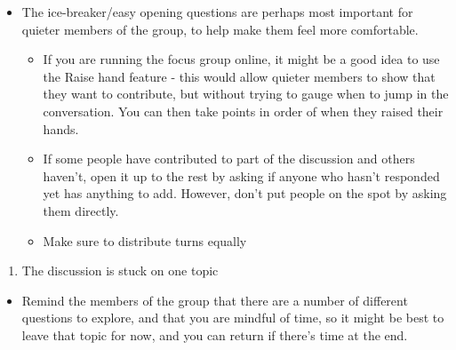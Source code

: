 \documentclass[
  english,
  letterpaper,
  DIV=11,
  numbers=noendperiod]{scrreprt}
\providecommand{\tightlist}{%
  \setlength{\itemsep}{0pt}\setlength{\parskip}{0pt}}
\begin{document}
\begin{tcolorbox}[enhanced jigsaw, breakable, bottomtitle=1mm, leftrule=.75mm, opacityback=0, colbacktitle=quarto-callout-caution-color!10!white, opacitybacktitle=0.6, toprule=.15mm, colback=white, left=2mm, coltitle=black, bottomrule=.15mm, titlerule=0mm, title={Suggested Solutions}, toptitle=1mm, colframe=quarto-callout-caution-color-frame, arc=.35mm, rightrule=.15mm]

\begin{itemize}
\tightlist
\item
  The ice-breaker/easy opening questions are perhaps most important for
  quieter members of the group, to help make them feel more comfortable.

  \begin{itemize}
  \tightlist
  \item
    If you are running the focus group online, it might be a good idea
    to use the Raise hand feature - this would allow quieter members to
    show that they want to contribute, but without trying to gauge when
    to jump in the conversation. You can then take points in order of
    when they raised their hands.
  \item
    If some people have contributed to part of the discussion and others
    haven't, open it up to the rest by asking if anyone who hasn't
    responded yet has anything to add. However, don't put people on the
    spot by asking them directly.
  \item
    Make sure to distribute turns equally
  \end{itemize}
\end{itemize}

\end{tcolorbox}

\begin{enumerate}
\def\labelenumi{\arabic{enumi}.}
\setcounter{enumi}{1}
\tightlist
\item
  The discussion is stuck on one topic
\end{enumerate}

\begin{tcolorbox}[enhanced jigsaw, breakable, bottomtitle=1mm, leftrule=.75mm, opacityback=0, colbacktitle=quarto-callout-caution-color!10!white, opacitybacktitle=0.6, toprule=.15mm, colback=white, left=2mm, coltitle=black, bottomrule=.15mm, titlerule=0mm, title={Suggested Solutions}, toptitle=1mm, colframe=quarto-callout-caution-color-frame, arc=.35mm, rightrule=.15mm]

\begin{itemize}
\tightlist
\item
  Remind the members of the group that there are a number of different
  questions to explore, and that you are mindful of time, so it might be
  best to leave that topic for now, and you can return if there's time
  at the end.
\end{itemize}

\end{tcolorbox}
\end{document}

